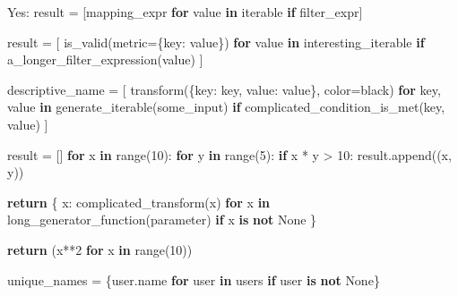 \documentclass[
]{article}
\newenvironment{Shaded}{}{}
\newcommand{\BuiltInTok}[1]{\textcolor[rgb]{0.00,0.50,0.00}{#1}}
\newcommand{\ControlFlowTok}[1]{\textcolor[rgb]{0.00,0.44,0.13}{\textbf{#1}}}
\newcommand{\DecValTok}[1]{\textcolor[rgb]{0.25,0.63,0.44}{#1}}
\newcommand{\KeywordTok}[1]{\textcolor[rgb]{0.00,0.44,0.13}{\textbf{#1}}}
\newcommand{\NormalTok}[1]{#1}
\newcommand{\OperatorTok}[1]{\textcolor[rgb]{0.40,0.40,0.40}{#1}}
\newcommand{\StringTok}[1]{\textcolor[rgb]{0.25,0.44,0.63}{#1}}
\newcommand{\VariableTok}[1]{\textcolor[rgb]{0.10,0.09,0.49}{#1}}
\begin{document}
\begin{samepage}
\begin{Shaded}
\begin{Highlighting}[]
\NormalTok{Yes:}
\NormalTok{  result }\OperatorTok{=}\NormalTok{ [mapping\_expr }\ControlFlowTok{for}\NormalTok{ value }\KeywordTok{in}\NormalTok{ iterable }\ControlFlowTok{if}\NormalTok{ filter\_expr]}

\NormalTok{  result }\OperatorTok{=}\NormalTok{ [}
\NormalTok{      is\_valid(metric}\OperatorTok{=}\NormalTok{\{}\StringTok{\textquotesingle{}key\textquotesingle{}}\NormalTok{: value\})}
      \ControlFlowTok{for}\NormalTok{ value }\KeywordTok{in}\NormalTok{ interesting\_iterable}
      \ControlFlowTok{if}\NormalTok{ a\_longer\_filter\_expression(value)}
\NormalTok{  ]}

\NormalTok{  descriptive\_name }\OperatorTok{=}\NormalTok{ [}
\NormalTok{      transform(\{}\StringTok{\textquotesingle{}key\textquotesingle{}}\NormalTok{: key, }\StringTok{\textquotesingle{}value\textquotesingle{}}\NormalTok{: value\}, color}\OperatorTok{=}\StringTok{\textquotesingle{}black\textquotesingle{}}\NormalTok{)}
      \ControlFlowTok{for}\NormalTok{ key, value }\KeywordTok{in}\NormalTok{ generate\_iterable(some\_input)}
      \ControlFlowTok{if}\NormalTok{ complicated\_condition\_is\_met(key, value)}
\NormalTok{  ]}

\NormalTok{  result }\OperatorTok{=}\NormalTok{ []}
  \ControlFlowTok{for}\NormalTok{ x }\KeywordTok{in} \BuiltInTok{range}\NormalTok{(}\DecValTok{10}\NormalTok{):}
    \ControlFlowTok{for}\NormalTok{ y }\KeywordTok{in} \BuiltInTok{range}\NormalTok{(}\DecValTok{5}\NormalTok{):}
      \ControlFlowTok{if}\NormalTok{ x }\OperatorTok{*}\NormalTok{ y }\OperatorTok{\textgreater{}} \DecValTok{10}\NormalTok{:}
\NormalTok{        result.append((x, y))}

  \ControlFlowTok{return}\NormalTok{ \{}
\NormalTok{      x: complicated\_transform(x)}
      \ControlFlowTok{for}\NormalTok{ x }\KeywordTok{in}\NormalTok{ long\_generator\_function(parameter)}
      \ControlFlowTok{if}\NormalTok{ x }\KeywordTok{is} \KeywordTok{not} \VariableTok{None}
\NormalTok{  \}}

  \ControlFlowTok{return}\NormalTok{ (x}\OperatorTok{**}\DecValTok{2} \ControlFlowTok{for}\NormalTok{ x }\KeywordTok{in} \BuiltInTok{range}\NormalTok{(}\DecValTok{10}\NormalTok{))}

\NormalTok{  unique\_names }\OperatorTok{=}\NormalTok{ \{user.name }\ControlFlowTok{for}\NormalTok{ user }\KeywordTok{in}\NormalTok{ users }\ControlFlowTok{if}\NormalTok{ user }\KeywordTok{is} \KeywordTok{not} \VariableTok{None}\NormalTok{\}}
\end{Highlighting}
\end{Shaded}
\end{samepage}
\end{document}
